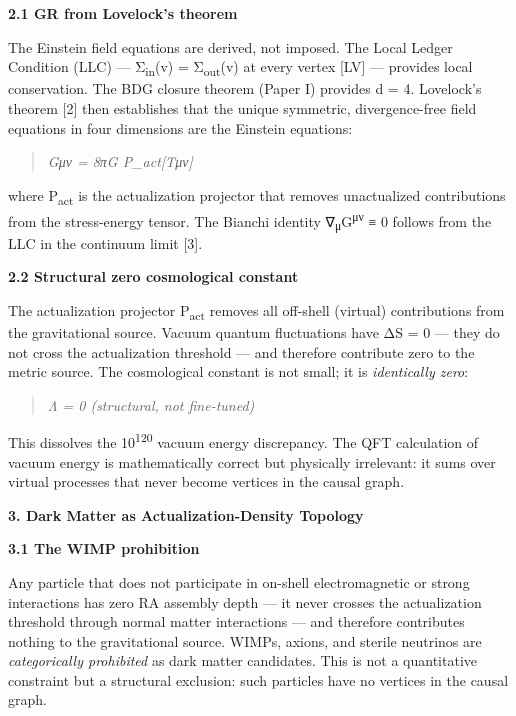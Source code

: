 \documentclass[12pt,a4paper]{article}
\begin{document}
\textbf{2.1 GR from Lovelock's theorem}

The Einstein field equations are derived, not imposed. The Local Ledger
Condition (LLC) --- Σ\textsubscript{in}(v) = Σ\textsubscript{out}(v) at
every vertex {[}LV{]} --- provides local conservation. The BDG closure
theorem (Paper I) provides d = 4. Lovelock's theorem {[}2{]} then
establishes that the unique symmetric, divergence-free field equations
in four dimensions are the Einstein equations:

\begin{quote}
\emph{Gμν = 8πG P\_act{[}Tμν{]}}
\end{quote}

where P\textsubscript{act} is the actualization projector that removes
unactualized contributions from the stress-energy tensor. The Bianchi
identity ∇\textsubscript{μ}G\textsuperscript{μν} ≡ 0 follows from the
LLC in the continuum limit {[}3{]}.

\textbf{2.2 Structural zero cosmological constant}

The actualization projector P\textsubscript{act} removes all off-shell
(virtual) contributions from the gravitational source. Vacuum quantum
fluctuations have ΔS = 0 --- they do not cross the actualization
threshold --- and therefore contribute zero to the metric source. The
cosmological constant is not small; it is \emph{identically zero}:

\begin{quote}
\emph{Λ = 0 (structural, not fine-tuned)}
\end{quote}

This dissolves the 10\textsuperscript{120} vacuum energy discrepancy.
The QFT calculation of vacuum energy is mathematically correct but
physically irrelevant: it sums over virtual processes that never become
vertices in the causal graph.

\textbf{3. Dark Matter as Actualization-Density Topology}

\textbf{3.1 The WIMP prohibition}

Any particle that does not participate in on-shell electromagnetic or
strong interactions has zero RA assembly depth --- it never crosses the
actualization threshold through normal matter interactions --- and
therefore contributes nothing to the gravitational source. WIMPs,
axions, and sterile neutrinos are \emph{categorically prohibited} as
dark matter candidates. This is not a quantitative constraint but a
structural exclusion: such particles have no vertices in the causal
graph.
\end{document}
